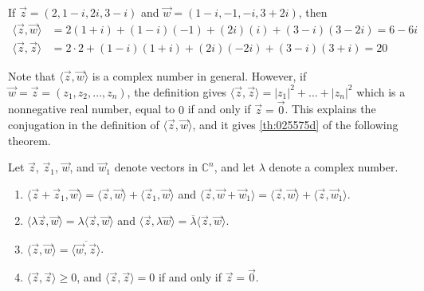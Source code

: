 \documentclass{ximera}
\begin{document}
\begin{example}\label{ex:025563}
If $\vec{z} = (2, 1 - i, 2i, 3 - i)$ and $\vec{w} = (1 - i, -1, -i, 3 + 2i)$, then
\begin{align*}
\langle \vec{z}, \vec{w} \rangle &= 2(1 + i) + (1 - i)(-1) + (2i)(i) + (3 - i)(3 - 2i) = 6 -6i \\
\langle \vec{z}, \vec{z} \rangle &= 2 \cdot 2 + (1 - i)(1 + i) + (2i)(-2i) + (3 - i)(3 + i) = 20
\end{align*}
\end{example}

Note that $\langle \vec{z}, \vec{w} \rangle$ is a complex number in general. However, if $\vec{w} = \vec{z} = (z_{1}, z_{2}, \ldots, z_{n})$, the definition gives $\langle \vec{z}, \vec{z} \rangle = |z_{1}|^{2} + \ldots  + |z_{n}|^{2}$ which is a nonnegative real number, equal to $0$ if and only if $\vec{z} = \vec{0}$. This explains the conjugation in the definition of $\langle \vec{z}, \vec{w} \rangle$, and it gives \ref{th:025575d} of the following theorem.


\begin{theorem}\label{th:025575}
Let $\vec{z}$, $\vec{z}_{1}$, $\vec{w}$, and $\vec{w}_{1}$ denote vectors in $\mathbb{C}^n$, and let $\lambda$ denote a complex number.
\begin{enumerate}
\item\label{th:025575a} $\langle \vec{z} + \vec{z}_{1}, \vec{w}\rangle = \langle \vec{z}, \vec{w} \rangle + \langle \vec{z}_{1}, \vec{w} \rangle$ \quad and \quad
$\langle \vec{z}, \vec{w} + \vec{w}_{1} \rangle = \langle \vec{z}, \vec{w} \rangle + \langle \vec{z}, \vec{w}_{1} \rangle$.

\item\label{th:025575b} $\langle \lambda \vec{z}, \vec{w} \rangle = \lambda \langle \vec{z}, \vec{w} \rangle$ \quad and \quad $\langle \vec{z}, \lambda \vec{w} \rangle = \overline{\lambda} \langle \vec{z}, \vec{w} \rangle$.

\item\label{th:025575c} $\langle \vec{z}, \vec{w} \rangle = \overline{\langle \vec{w}, \vec{z} \rangle}$.

\item\label{th:025575d} $\langle \vec{z}, \vec{z} \rangle \ge 0$, \quad and \quad $\langle \vec{z}, \vec{z} \rangle = 0$ if and only if $\vec{z} = \vec{0}$.

\end{enumerate}
\end{theorem}
\end{document}

